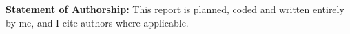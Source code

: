  
 
\textbf{Statement of Authorship: }This report is planned, coded and written entirely by me, and I cite authors where applicable. 





